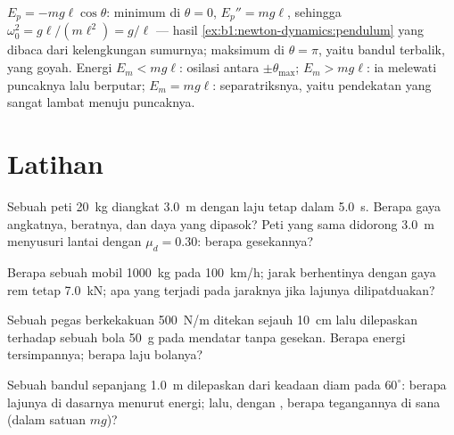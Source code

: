 \begin{example}\label{ex:b1:work-and-energy:pendulum}
$E_p = -mg\ell\cos\theta$: minimum di $\theta = 0$, $E_p'' = mg\ell$,
sehingga $\omega_0^2 = g\ell/(m\ell^2) = g/\ell$ --- hasil 
\cref{ex:b1:newton-dynamics:pendulum} yang dibaca dari kelengkungan
sumurnya; maksimum di $\theta = \pi$, yaitu bandul terbalik, yang goyah.
Energi $E_m < mg\ell$: osilasi antara $\pm\theta_{\max}$; $E_m > mg\ell$:
ia melewati puncaknya lalu berputar; $E_m = mg\ell$: separatriksnya,
yaitu pendekatan yang sangat lambat menuju puncaknya.
\end{example}

\section{Latihan}

\begin{exercise}[$\star$]\label{exo:b1:work-and-energy:1}
Sebuah peti \qty{20}{kg} diangkat \qty{3.0}{m} dengan laju tetap dalam
\qty{5.0}{s}. Berapa  gaya angkatnya,  beratnya, dan daya yang
dipasok? Peti yang sama didorong \qty{3.0}{m} menyusuri lantai dengan
$\mu_d = 0.30$: berapa  gesekannya?
\end{exercise}

\begin{exercise}[$\star$]\label{exo:b1:work-and-energy:2}
Berapa  sebuah mobil \qty{1000}{kg} pada \qty{100}{km/h};
jarak berhentinya dengan gaya rem tetap \qty{7.0}{kN}; apa yang terjadi
pada jaraknya jika lajunya dilipatduakan?
\end{exercise}

\begin{exercise}[$\star$]\label{exo:b1:work-and-energy:3}
Sebuah pegas berkekakuan \qty{500}{N/m} ditekan sejauh \qty{10}{cm} lalu
dilepaskan terhadap sebuah bola \qty{50}{g} pada  mendatar tanpa
gesekan. Berapa energi tersimpannya; berapa laju bolanya?
\end{exercise}

\begin{exercise}[$\star$]\label{exo:b1:work-and-energy:4}
Sebuah bandul sepanjang \qty{1.0}{m} dilepaskan dari keadaan diam pada
$60^\circ$: berapa lajunya di dasarnya menurut energi; lalu, dengan
, berapa tegangannya di sana (dalam satuan $mg$)?
\end{exercise}

